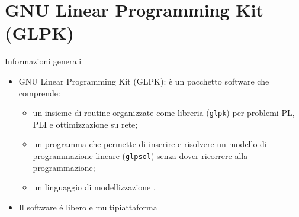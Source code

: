 \documentclass{beamer}
\begin{document}
\generatitolo

\section{GNU Linear Programming Kit (GLPK)}

\begin{frame}{Informazioni generali}
\begin{itemize}
\item \alert{GNU Linear Programming Kit (GLPK)}:
 \`e un pacchetto software che comprende:
   \begin{itemize} 
	 \item un insieme di routine organizzate come libreria (\texttt{glpk})
	 per problemi PL, PLI e ottimizzazione su rete;
	 \item un programma che permette di inserire e risolvere un modello di programmazione lineare (\texttt{glpsol}) senza dover ricorrere alla programmazione;
	 \item un linguaggio di modellizzazione .
   \end{itemize}
  \item  Il software \'e libero e multipiattaforma
\end{itemize}    
\end{frame}

\end{document}
